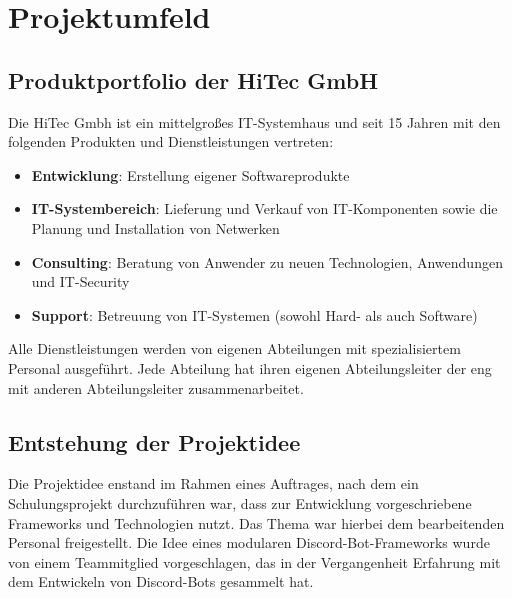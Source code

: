 
\section{Projektumfeld}\label{projektumfeld}

\subsection{Produktportfolio der HiTec GmbH}\label{produktportfolio-der-hitec-gmbh}
Die HiTec Gmbh ist ein mittelgroßes IT-Systemhaus und seit 15 Jahren mit den folgenden Produkten und Dienstleistungen vertreten:

\begin{itemize}
        \item \textbf{Entwicklung}: Erstellung eigener Softwareprodukte
        \item \textbf{IT-Systembereich}: Lieferung und Verkauf von IT-Komponenten sowie die Planung und Installation von Netwerken
         \item \textbf{Consulting}: Beratung von Anwender zu neuen Technologien, Anwendungen und IT-Security
          \item \textbf{Support}: Betreuung von IT-Systemen (sowohl Hard- als auch Software)
\end{itemize}

\pagebreak

Alle Dienstleistungen werden von eigenen Abteilungen mit spezialisiertem Personal ausgeführt. Jede Abteilung hat ihren eigenen Abteilungsleiter der eng mit anderen Abteilungsleiter zusammenarbeitet.

\subsection{Entstehung der Projektidee}\label{entstehung-der-projektidee}

Die Projektidee enstand im Rahmen eines Auftrages, nach dem ein Schulungsprojekt durchzuführen war, dass zur Entwicklung vorgeschriebene Frameworks und Technologien nutzt. Das Thema war hierbei dem bearbeitenden Personal freigestellt. Die Idee eines modularen Discord-Bot-Frameworks wurde von einem Teammitglied vorgeschlagen, das in der Vergangenheit Erfahrung mit dem Entwickeln von Discord-Bots gesammelt hat.